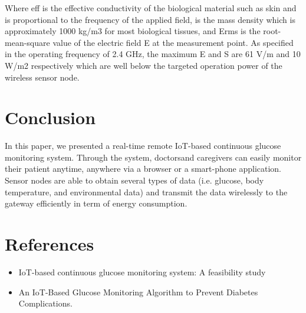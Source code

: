 \documentclass{article}
\begin{document}
Where eff is the effective conductivity of the biological material such as skin and is proportional to the frequency of the applied field, is the mass density which is approximately 1000 kg/m3 for most biological tissues, and Erms is the root-mean-square value of the electric field E at the measurement point. As specified in the operating frequency of 2.4 GHz, the maximum E and S are 61 V/m and 10 W/m2 respectively which are well below the targeted operation power of the wireless sensor node.   

\section{Conclusion}
In this paper, we presented a real-time remote IoT-based continuous glucose monitoring system. Through the system, doctorsand caregivers can easily monitor their patient anytime, anywhere via a browser or a smart-phone application. Sensor nodes are able to obtain several types of data (i.e. glucose, body temperature, and environmental data) and transmit the data wirelessly to the gateway efficiently in term of energy consumption.

\section{References}
\begin{itemize}
\item IoT-based continuous glucose monitoring system: A feasibility study
\item An IoT-Based Glucose Monitoring Algorithm to
Prevent Diabetes Complications.
\end{itemize}
\end{document}
